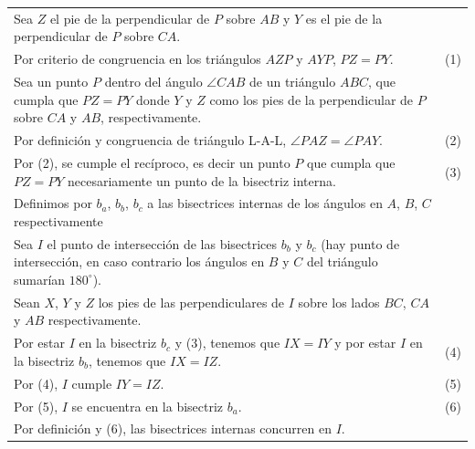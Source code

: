 \documentclass[12pt,a4paper, oneside]{book}
\begin{document}
\begin{tabular}{p{15.9cm}p{1cm}}
\\Sea $Z$ el pie de la perpendicular de $P$ sobre $AB$ y $Y$ es el pie de la perpendicular de $P$ sobre $CA$.
\\Por criterio de congruencia en los triángulos $AZP$ y $AYP$, $PZ=PY$. & (1)
\\Sea un punto $P$ dentro del ángulo $\angle CAB$ de un triángulo $ABC$, que cumpla que $PZ=PY$ donde $Y$ y $Z$ como los pies de la perpendicular de $P$ sobre $CA$ y $AB$, respectivamente.
\\Por definición y congruencia de triángulo L-A-L, $\angle PAZ = \angle PAY$. &(2) 
\\Por (2), se cumple el recíproco, es decir un punto $P$ que cumpla que $PZ=PY$ necesariamente un punto de la bisectriz interna. & \medskip(3)
\\Definimos por $b_a$, $b_b$, $b_c$ a las bisectrices internas de los ángulos en $A$, $B$, $C$ respectivamente
\\Sea $I$ el punto de intersección de las bisectrices $b_b$ y $b_c$ (hay punto de intersección, en caso contrario los ángulos en $B$ y $C$ del triángulo sumarían $180^{\circ}$).
\\Sean $X$, $Y$ y $Z$ los pies de las perpendiculares de $I$ sobre los lados $BC$, $CA$ y $AB$ respectivamente. 
\\Por estar $I$ en la bisectriz $b_c$ y (3), tenemos que $IX=IY$ y por estar $I$ en la bisectriz $b_b$, tenemos que $IX=IZ$. &\medskip(4)
\\Por (4), $I$ cumple $IY=IZ$. &(5)
\\Por (5), $I$ se encuentra en la bisectriz $b_a$.& (6)
\\Por definición y (6), las bisectrices internas concurren en $I$.
\end{tabular}
\end{document}
